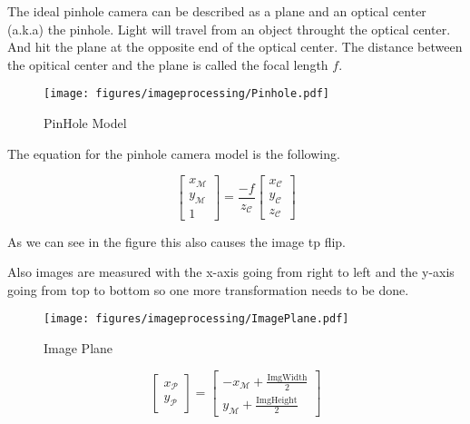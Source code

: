 \label{chap:imgpros}

\label{sec:imgintro}

\label{sec:imgpinhole}

The ideal pinhole camera can be described as a plane and an optical center (a.k.a) the pinhole. Light will travel from an object throught the optical center.
And hit the plane at the opposite end of the optical center. The distance between the opitical center and the plane is called the focal length $f$.


\begin{figure}[H]
    \centering
    \texttt{[image: figures/imageprocessing/Pinhole.pdf]}
    \caption{PinHole Model}
    \label{fig}
\end{figure}


The equation for the pinhole camera model is the following.

\begin{equation}
\begin{bmatrix}
    x_\mathcal{M} \\
    y_\mathcal{M} \\
    1 
\end{bmatrix}
= \frac{-f}{z_\mathcal{C}}
\begin{bmatrix}
    x_\mathcal{C} \\
    y_\mathcal{C} \\
    z_\mathcal{C}
\end{bmatrix}
\end{equation}

As we can see in the figure this also causes the image tp flip.

Also images are measured with the x-axis going from right to left and the y-axis going from top to bottom so one more transformation needs to be done.

\begin{figure}[H]
    \centering
    \texttt{[image: figures/imageprocessing/ImagePlane.pdf]}
    \caption{Image Plane}
    \label{fig4.2}
\end{figure}

\begin{equation}
\begin{bmatrix}
x_\mathcal{P} \\
y_\mathcal{P}
\end{bmatrix}
=
\begin{bmatrix}
    -x_\mathcal{M} + \frac{\text{ImgWidth}}{2} \\
    y_\mathcal{M} + \frac{\text{ImgHeight}}{2}
\end{bmatrix}
\end{equation}


